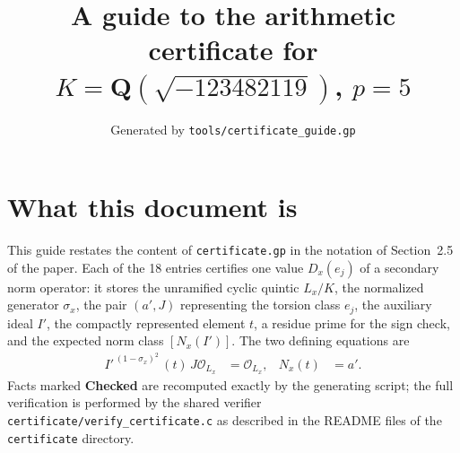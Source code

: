\documentclass[11pt]{article}
\title{A guide to the arithmetic certificate for $K=\mathbf Q(\sqrt{-123482119})$, $p=5$}
\author{}
\date{Generated by \texttt{tools/certificate\_guide.gp}}
\begin{document}
\maketitle
\section*{What this document is}
This guide restates the content of \texttt{certificate.gp} in the
notation of Section~2.5 of the paper.  Each of the 18 entries
certifies one value $D_x(e_j)$ of a secondary norm operator: it
stores the unramified cyclic quintic $L_x/K$, the normalized
generator $\sigma_x$, the pair $(a',J)$ representing the torsion
class $e_j$, the auxiliary ideal $I'$, the compactly represented
element $t$, a residue prime for the sign check, and the expected
norm class $[N_x(I')]$.  The two defining equations are
\begin{align*}
I'^{\,(1-\sigma_x)^2}\,(t)\,J\mathcal O_{L_x}&=\mathcal O_{L_x},&
N_x(t)&=a'.
\end{align*}
Facts marked \textbf{Checked} are recomputed exactly by the
generating script; the full verification is performed by the
shared verifier \texttt{certificate/verify\_certificate.c} as
described in the README files of the \texttt{certificate}
directory.
\end{document}
